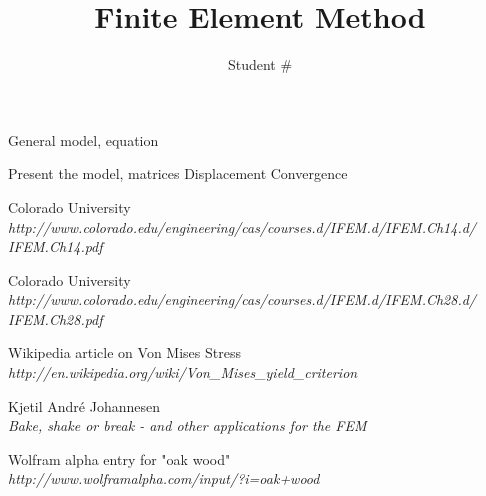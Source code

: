 \documentclass[9pt]{extarticle}
\title{Finite Element Method}
\author{Student \# }
\begin{document}
\maketitle



General model, equation




Present the model, matrices
Displacement
Convergence






















\begin{thebibliography}{3}

	Colorado University\\
	\emph{http://www.colorado.edu/engineering/cas/courses.d/IFEM.d/IFEM.Ch14.d/\\IFEM.Ch14.pdf}


	Colorado University\\
	\emph{http://www.colorado.edu/engineering/cas/courses.d/IFEM.d/IFEM.Ch28.d/\\IFEM.Ch28.pdf}	


Wikipedia article on Von Mises Stress \\
\emph{http://en.wikipedia.org/wiki/Von\_Mises\_yield\_criterion}

Kjetil André Johannesen \\
\emph{Bake, shake or break - and other applications for the FEM}

	Wolfram alpha entry for "oak wood"\\
	\emph{http://www.wolframalpha.com/input/?i=oak+wood}


\end{thebibliography}
\end{document}
